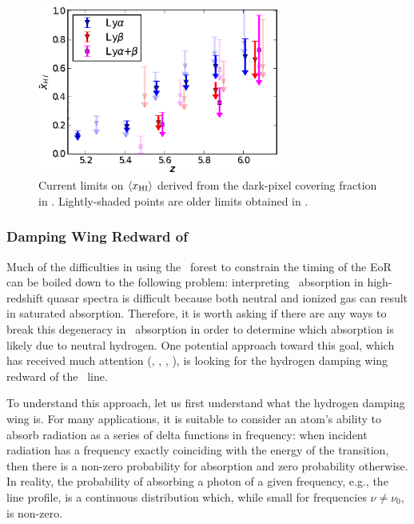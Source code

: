 \begin{figure}[!p]
  \centering
  \includegraphics[width=8cm]{xhi_newdata.eps}
  \caption{Current limits on $\langle x_{\text{HI}}\rangle$ derived from the dark-pixel covering fraction in \citet{McGreer:2014qwa}. Lightly-shaded points are older limits obtained in \citet{McGreer:2011dm}.}
  \label{fig:McGreer}
\end{figure}


\clearpage
\subsubsection{Damping Wing Redward of \lya}\label{sec:IntroDampingWing}

Much of the difficulties in using the \lya\ forest to constrain the timing of the EoR can be boiled down to the following problem: interpreting \lya\ absorption in high-redshift quasar spectra is difficult because both neutral and ionized gas can result in saturated absorption. Therefore, it is worth asking if there are any ways to break this degeneracy in \lya\ absorption in order to determine which absorption is likely due to neutral hydrogen. One potential approach toward this goal, which has received much attention (\citealt{Chornock:2013una}, \citealt{Chornock:2014fva}, \citealt{Mortlock2011}, \citealt{Bolton:2011vb}), is looking for the hydrogen damping wing redward of the \lya\ line. 


To understand this approach, let us first understand what the hydrogen damping wing is. For many applications, it is suitable to consider an atom's ability to absorb radiation as a series of delta functions in frequency: when incident radiation has a frequency exactly coinciding with the energy of the transition, then there is a non-zero probability for absorption and zero probability otherwise. In reality, the probability of absorbing a photon of a given frequency, e.g., the line profile, is a continuous distribution which, while small for frequencies $\nu \neq \nu_{0}$, is non-zero. 


